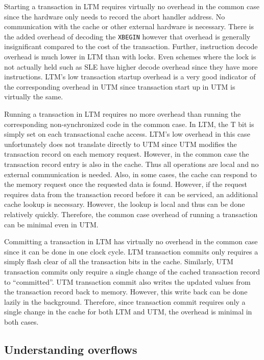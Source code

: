 Starting a transaction in LTM requires virtually no overhead in the
common case since the hardware only needs to record the abort handler
address. No communication with the cache or other external hardware is
necessary. There is the added overhead of decoding the \texttt{XBEGIN}
however that overhead is generally insignificant compared to the cost
of the transaction. Further, instruction decode overhead is much lower
in LTM than with locks. Even schemes where the lock is not actually
held such as SLE have higher decode overhead since they have more
instructions. LTM's low transaction startup overhead is a very good
indicator of the corresponding overhead in UTM since transaction start
up in UTM is virtually the same.

Running a transaction in LTM requires no more overhead than running
the corresponding non-synchronized code in the common case. In LTM,
the T bit is simply set on each transactional cache access. LTM's low
overhead in this case unfortunately does not translate directly to UTM
since UTM modifies the transaction record on each memory
request. However, in the common case the transaction record entry is
also in the cache. Thus all operations are local and no external
communication is needed. Also, in some cases, the cache can respond to
the memory request once the requested data is found. However, if the
request requires data from the transaction record before it can be
serviced, an additional cache lookup is necessary. However, the lookup
is local and thus can be done relatively quickly.  Therefore, the common case overhead of
running a transaction can be minimal even in UTM.

Committing a transaction in LTM has virtually no overhead in the
common case since it can be done in one clock cycle. LTM transaction
commits only requires a simply flash clear of all the transaction bits
in the cache. Similarly, UTM transaction commits only require a single
change of the cached transaction record to ``committed''. UTM
transaction commit also writes the updated values from the transaction
record back to memory. However, this write back can be done lazily in
the background.  Therefore, since transaction commit requires only a
single change in the cache for both LTM and UTM, the overhead is
minimal in both cases.

\subsection{Understanding overflows}

